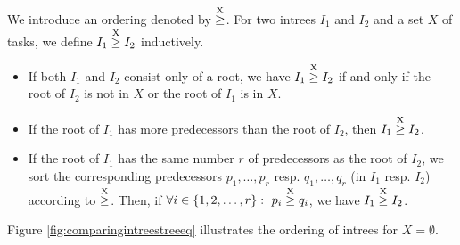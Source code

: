 \begin{definition}
  We introduce an ordering denoted by $\stackrel{\text{X}}{\geq}$. For two intrees $I_1$ and $I_2$ and a set $X$ of tasks, we define $I_1 \stackrel{\text{X}}{\geq} I_2$ inductively. 
  \begin{itemize}
  \item If both $I_1$ and $I_2$ consist only of a root, we have $I_1 \stackrel{\text{X}}{\geq} I_2$ if and only if the root of $I_2$ is not in $X$ or the root of $I_1$ is in $X$.
  \item If the root of $I_1$ has more predecessors than the root of $I_2$, then $I_1 \stackrel{\text{X}}{\geq} I_2$.
  \item If the root of $I_1$ has the same number $r$ of predecessors as the root of $I_2$, we sort the corresponding predecessors $p_1,\dots,p_r$ resp. $q_1,\dots,q_r$ (in $I_1$ resp. $I_2$) according to $\stackrel{\text{X}}{\geq}$. Then, if $\forall i\in\{1,2,\dots,r \}:\ p_i \stackrel{\text{X}}{\geq} q_i$, we have $I_1 \stackrel{\text{X}}{\geq} I_2$.
  \end{itemize}
\end{definition}

Figure \ref{fig:comparingintreestreeeq} illustrates the ordering of intrees for $X=\emptyset$.

